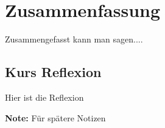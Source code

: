\section{Zusammenfassung }

Zusammengefasst kann man sagen....

\subsection{Kurs Reflexion}

Hier ist die Reflexion

{\bf Note:} Für spätere Notizen